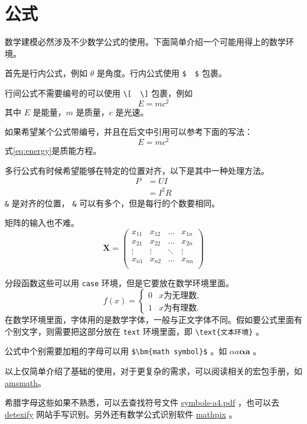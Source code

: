 \section{公式}

数学建模必然涉及不少数学公式的使用。下面简单介绍一个可能用得上的数学环境。

首先是行内公式，例如 $ \theta $ 是角度。行内公式使用 \verb|$  $| 包裹。

行间公式不需要编号的可以使用 \verb|\[  \]| 包裹，例如
\[
E=mc^2
\]
其中 $ E $ 是能量，$ m $ 是质量，$ c $ 是光速。

如果希望某个公式带编号，并且在后文中引用可以参考下面的写法：
\begin{equation}
E=mc^2
\label{eq:energy}
\end{equation}
式\cref{eq:energy}是质能方程。

多行公式有时候希望能够在特定的位置对齐，以下是其中一种处理方法。
\begin{align}
P & = UI \\
& = I^2R
\end{align}
\verb|&| 是对齐的位置， \verb|&| 可以有多个，但是每行的个数要相同。

矩阵的输入也不难。
\[
\mathbf{X} = \left(
    \begin{array}{cccc}
    x_{11} & x_{12} & \ldots & x_{1n}\\
    x_{21} & x_{22} & \ldots & x_{2n}\\
    \vdots & \vdots & \ddots & \vdots\\
    x_{n1} & x_{n2} & \ldots & x_{nn}\\
    \end{array} \right)
\]

分段函数这些可以用 \verb|case| 环境，但是它要放在数学环境里面。
\[
f(x) =
    \begin{cases}
        0 &  x \text{为无理数} ,\\
        1 &  x \text{为有理数} .
    \end{cases}
\]
在数学环境里面，字体用的是数学字体，一般与正文字体不同。假如要公式里面有个别文字，则需要把这部分放在 \verb|text| 环境里面，即 \verb|\text{文本环境}| 。

公式中个别需要加粗的字母可以用 \verb|$\bm{math symbol}$| 。如 $ \alpha a\bm{\alpha a} $ 。

以上仅简单介绍了基础的使用，对于更复杂的需求，可以阅读相关的宏包手册，如 \href{http://texdoc.net/texmf-dist/doc/latex/amsmath/amsldoc.pdf}{amsmath}。

希腊字母这些如果不熟悉，可以去查找符号文件 \href{http://mirrors.ctan.org/info/symbols/comprehensive/symbols-a4.pdf}{symbols-a4.pdf} ，也可以去 \href{http://detexify.kirelabs.org/classify.html}{detexify} 网站手写识别。另外还有数学公式识别软件 \href{https://mathpix.com/}{mathpix} 。

